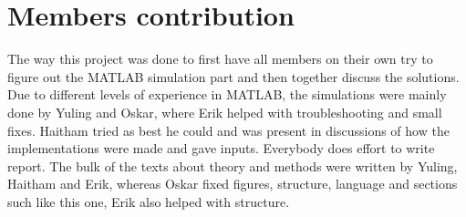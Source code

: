 \documentclass[conference]{IEEEtran}
\begin{document}
    
  
\section{Members contribution}
The way this project was done to first have all members on their own try to figure out the MATLAB simulation part and then together discuss the solutions. Due to different levels of experience in MATLAB, the simulations were mainly done by Yuling and Oskar, where Erik helped with troubleshooting and small fixes. Haitham tried as best he could and was present in discussions of how the implementations were made and gave inputs. Everybody does effort to write report. The bulk of the texts about theory and methods were written by Yuling, Haitham and Erik, whereas Oskar fixed figures, structure, language and sections such like this one, Erik also helped with structure.

\newpage
 
\end{document}
